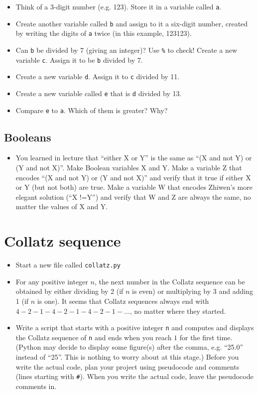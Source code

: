 \documentclass[pdflatex,a4paper]{article}
\begin{document}
\begin{itemize}
\item
Think of a 3-digit number (e.g. 123). Store it in a variable called \verb=a=. 
\item
Create another variable called \verb=b= and assign to it a six-digit number, created by writing the digits of \verb=a= twice (in this example, 123123). 
\item
Can \verb=b= be divided by 7 (giving an integer)?  Use \verb=%= to check!  Create a new variable \verb=c=. Assign it to be \verb=b= divided by 7.
\item
Create a new variable \verb=d=. Assign it to \verb=c= divided by 11.
\item
Create a new variable called \verb=e= that is \verb=d= divided by 13.
\item
Compare \verb=e= to \verb=a=. Which of them is greater? Why?
\end{itemize}

\subsection{Booleans}

\begin{itemize}
\item
You learned in lecture that ``either X or Y'' is the same as ``(X and not Y) or (Y and not X)''. Make Boolean variables X and Y. Make a variable Z that encodes ``(X and not Y) or (Y and not X)'' and verify that it true if either X or Y (but not both) are true. Make a variable W that encodes Zhiwen's more elegant solution (``X !=Y'') and verify that W and Z are always the same, no matter the values of X and Y. 
\end{itemize}

\section{Collatz sequence}

\begin{itemize}
\item
Start a new file called \verb=collatz.py=
\item
For any positive integer \(n\), the next number in the Collatz sequence can be obtained by either dividing by 2 (if \(n\) is even) or multiplying by 3 and adding 1 (if \(n\) is one). It seems that Collatz sequences always end with \(4-2-1-4-2-1-4-2-1-\dots\), no matter where they started. 
\item
Write a script that starts with a positive integer \verb=n= and computes and displays the Collatz sequence of \verb-n- and ends when you reach \(1\) for the first time. (Python may decide to display some figure(s) after the comma, e.g. ``25.0'' instead of ``25''. This is nothing to worry about at this stage.) Before you write the actual code, plan your project using pseudocode and comments (lines starting with \verb=#=). When you write the actual code, leave the pseudocode comments in.
\end{itemize}
\end{document}
